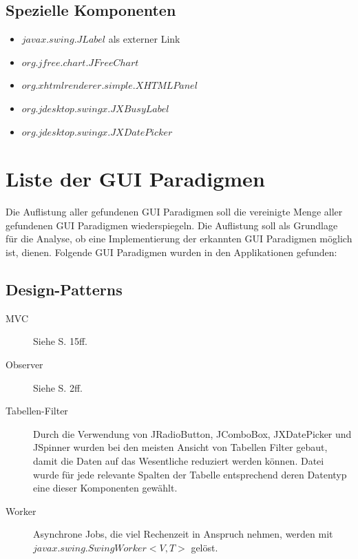   \subsection{Spezielle Komponenten}
  
  \begin{itemize}
    \item \(javax.swing.JLabel\) als externer Link
    \item \(org.jfree.chart.JFreeChart\)
    \item \(org.xhtmlrenderer.simple.XHTMLPanel\)
    \item \(org.jdesktop.swingx.JXBusyLabel\)
    \item \(org.jdesktop.swingx.JXDatePicker\)
  \end{itemize}
  
  \section{Liste der GUI Paradigmen}
  
  Die Auflistung aller gefundenen GUI Paradigmen soll die vereinigte Menge aller
  gefundenen GUI Paradigmen wiederspiegeln. Die Auflistung soll als Grundlage für
  die Analyse, ob eine Implementierung der erkannten GUI Paradigmen möglich
  ist, dienen. Folgende GUI Paradigmen wurden in den Applikationen gefunden:
      
  \subsection{Design-Patterns}
  
  \begin{description}
    \item[MVC]
    Siehe \cite{GUIDesignPatterns} S. 15ff.
    \item[Observer]
    Siehe \cite{GUIDesignPatterns} S. 2ff.
    \item[Tabellen-Filter]
    Durch die Verwendung von JRadioButton, JComboBox, JXDatePicker und JSpinner
    wurden bei den meisten Ansicht von Tabellen Filter gebaut, damit die Daten
    auf das Wesentliche reduziert werden können. Datei wurde für jede relevante
    Spalten der Tabelle entsprechend deren Datentyp eine dieser Komponenten
    gewählt.
    \item[Worker]
    Asynchrone Jobs, die viel Rechenzeit in Anspruch nehmen, werden mit\\
    \(javax.swing.SwingWorker<V,T>\) gelöst.
  \end{description}
  
